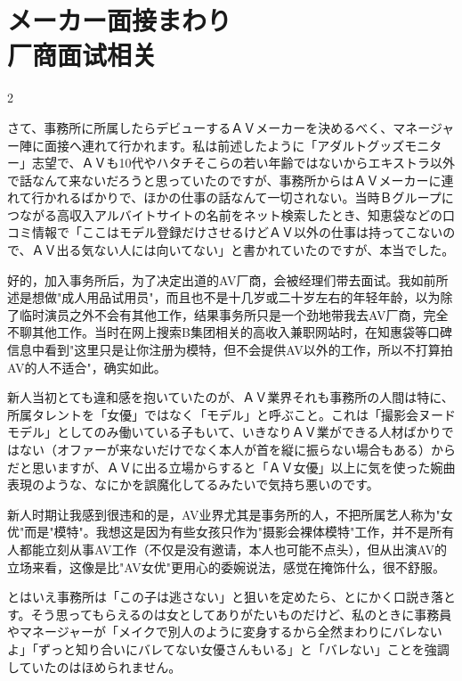 \documentclass[12pt,UTF8]{ctexbook}
\begin{document}
\section{メーカー面接まわり\\厂商面试相关}

\begin{paracol}{2}

さて、事務所に所属したらデビューするＡＶメーカーを決めるべく、マネージャー陣に面接へ連れて行かれます。私は前述したように「アダルトグッズモニター」志望で、ＡＶも10代やハタチそこらの若い年齢ではないからエキストラ以外で話なんて来ないだろうと思っていたのですが、事務所からはＡＶメーカーに連れて行かれるばかりで、ほかの仕事の話なんて一切されない。当時Ｂグループにつながる高収入アルバイトサイトの名前をネット検索したとき、知恵袋などの口コミ情報で「ここはモデル登録だけさせるけどＡＶ以外の仕事は持ってこないので、ＡＶ出る気ない人には向いてない」と書かれていたのですが、本当でした。

\switchcolumn

好的，加入事务所后，为了决定出道的AV厂商，会被经理们带去面试。我如前所述是想做"成人用品试用员"，而且也不是十几岁或二十岁左右的年轻年龄，以为除了临时演员之外不会有其他工作，结果事务所只是一个劲地带我去AV厂商，完全不聊其他工作。当时在网上搜索B集团相关的高收入兼职网站时，在知惠袋等口碑信息中看到"这里只是让你注册为模特，但不会提供AV以外的工作，所以不打算拍AV的人不适合"，确实如此。

\switchcolumn*

新人当初とても違和感を抱いていたのが、ＡＶ業界それも事務所の人間は特に、所属タレントを「女優」ではなく「モデル」と呼ぶこと。これは「撮影会ヌードモデル」としてのみ働いている子もいて、いきなりＡＶ業ができる人材ばかりではない（オファーが来ないだけでなく本人が首を縦に振らない場合もある）からだと思いますが、ＡＶに出る立場からすると「ＡＶ女優」以上に気を使った婉曲表現のような、なにかを誤魔化してるみたいで気持ち悪いのです。

\switchcolumn

新人时期让我感到很违和的是，AV业界尤其是事务所的人，不把所属艺人称为"女优"而是"模特"。我想这是因为有些女孩只作为"摄影会裸体模特"工作，并不是所有人都能立刻从事AV工作（不仅是没有邀请，本人也可能不点头），但从出演AV的立场来看，这像是比"AV女优"更用心的委婉说法，感觉在掩饰什么，很不舒服。

\switchcolumn*

とはいえ事務所は「この子は逃さない」と狙いを定めたら、とにかく口説き落とす。そう思ってもらえるのは女としてありがたいものだけど、私のときに事務員やマネージャーが「メイクで別人のように変身するから全然まわりにバレないよ」「ずっと知り合いにバレてない女優さんもいる」と「バレない」ことを強調していたのはほめられません。


\end{paracol}
\end{document}
